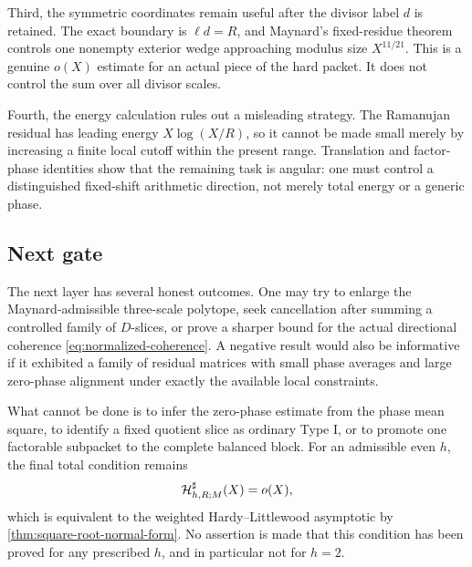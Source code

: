 Third, the symmetric coordinates remain useful after the divisor label
$d$ is retained.  The exact boundary is $\ell d=R$, and Maynard's
fixed-residue theorem controls one nonempty exterior wedge approaching
modulus size $X^{11/21}$.  This is a genuine $o(X)$ estimate for an actual
piece of the hard packet.  It does not control the sum over all divisor
scales.

Fourth, the energy calculation rules out a misleading strategy.  The
Ramanujan residual has leading energy $X\log(X/R)$, so it cannot be made
small merely by increasing a finite local cutoff within the present
range.  Translation and factor-phase identities show that the remaining
task is angular: one must control a distinguished fixed-shift arithmetic
direction, not merely total energy or a generic phase.

\subsection{Next gate}

The next layer has several honest outcomes.  One may try to enlarge the
Maynard-admissible three-scale polytope, seek cancellation after summing a
controlled family of $D$-slices, or prove a sharper bound for the actual
directional coherence \eqref{eq:normalized-coherence}.  A negative result
would also be informative if it exhibited a family of residual matrices
with small phase averages and large zero-phase alignment under exactly
the available local constraints.

What cannot be done is to infer the zero-phase estimate from the phase
mean square, to identify a fixed quotient slice as ordinary Type I, or to
promote one factorable subpacket to the complete balanced block.  For an
admissible even $h$, the final total condition remains
\[
 \mathcal H^\sharp_{h,R;M}(X)=o(X),
\]
which is equivalent to the weighted Hardy--Littlewood asymptotic by
\cref{thm:square-root-normal-form}.  No assertion is made that this
condition has been proved for any prescribed $h$, and in particular not
for $h=2$.
